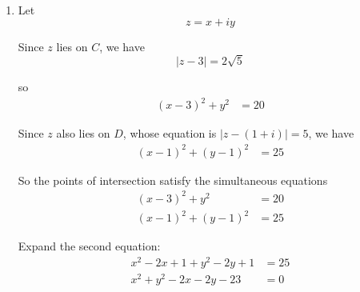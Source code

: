\documentclass[leqno]{article}
\begin{document}
\begin{enumerate}[
  label=\textbf{\arabic*.},
  leftmargin=*,
  topsep=0pt,
  partopsep=0pt,
  parsep=0pt
]
\begin{djsSolution}
\begin{enumerate}[label=\textbf{(\alph*)}]
  So the centre is $(h,0)$ on the Argand diagram.

  Since $A(1,4)$ and $B(7,2)$ both lie on $C$, their distances from the centre are equal:
  \begin{align*}
  (h-1)^2+4^2&=(h-7)^2+2^2 \\
  (h-1)^2+16&=(h-7)^2+4
  \end{align*}

  Expanding:
  \begin{align*}
  h^2-2h+1+16&=h^2-14h+49+4 \\
  -2h+17&=-14h+53 \\
  12h&=36 \\
  h&=3
  \end{align*}

  So the centre is the complex number $3$.

  Now find the radius using point $A$:
  \begin{align*}
  r^2&=(3-1)^2+4^2 \\
  &=2^2+4^2 \\
  &=4+16 \\
  &=20
  \end{align*}

  Hence
  \[
  r=\sqrt{20}=2\sqrt{5}
  \]

  Therefore the equation of $C$ is
  \[
  |z-3|=2\sqrt{5}
  \]

  \item Let
  \[
  z=x+iy
  \]

  Since $z$ lies on $C$, we have
  \[
  |z-3|=2\sqrt{5}
  \]

  so
  \begin{align*}
  (x-3)^2+y^2&=20
  \end{align*}

  Since $z$ also lies on $D$, whose equation is $|z-(1+i)|=5$, we have
  \begin{align*}
  (x-1)^2+(y-1)^2&=25
  \end{align*}

  So the points of intersection satisfy the simultaneous equations
  \begin{align*}
  (x-3)^2+y^2&=20 \\
  (x-1)^2+(y-1)^2&=25
  \end{align*}

  Expand the second equation:
  \begin{align*}
  x^2-2x+1+y^2-2y+1&=25 \\
  x^2+y^2-2x-2y-23&=0
  \end{align*}


\end{enumerate}
\end{djsSolution}
\end{enumerate}
\end{document}
